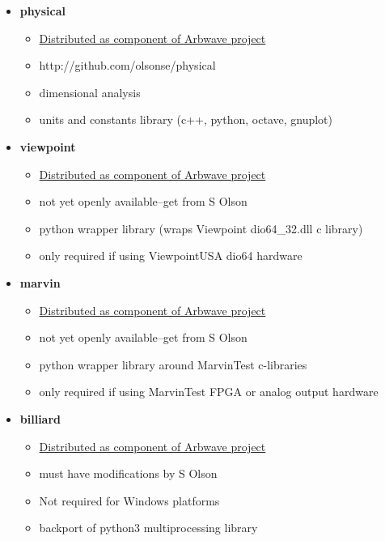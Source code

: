 \begin{itemize}
\begin{itemize}
      \item \textbf{physical}
        \begin{itemize}
          \item \underline{Distributed as component of Arbwave project}
          \item http://github.com/olsonse/physical
          \item dimensional analysis
          \item units and constants library (c++, python, octave, gnuplot)
        \end{itemize}

      \item \textbf{viewpoint}
        \begin{itemize}
          \item \underline{Distributed as component of Arbwave project}
          \item not yet openly available--get from S Olson
          \item python wrapper library (wraps Viewpoint dio64\_32.dll c library)
          \item only required if using ViewpointUSA dio64 hardware
        \end{itemize}

      \item \textbf{marvin}
        \begin{itemize}
          \item \underline{Distributed as component of Arbwave project}
          \item not yet openly available--get from S Olson
          \item python wrapper library around MarvinTest c-libraries
          \item only required if using MarvinTest FPGA or analog output hardware
        \end{itemize}

      \item \textbf{billiard}
        \begin{itemize}
          \item \underline{Distributed as component of Arbwave project}
          \item must have modifications by S Olson
          \item Not required for Windows platforms
          \item backport of python3 multiprocessing library
        \end{itemize}
    \end{itemize}


\end{itemize}

